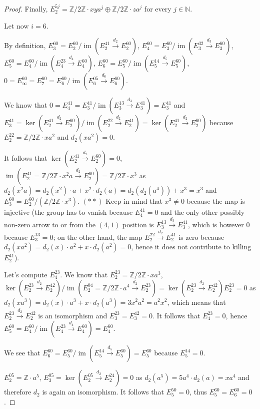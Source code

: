 \documentclass{article}
\newcommand{\numberset}{\mathbb}
\newcommand{\N}{\numberset{N}}
\newcommand{\Z}{\numberset{Z}}
\DeclareMathOperator{\im}{im}
\begin{document}
\begin{proof}
    Finally, $E^{5j}_2=\Z/2\Z\cdot xya^j\oplus\Z/2\Z\cdot za^j$ for every
    $j\in\N$.

    Let now $i=6$.

    By definition, $E^{60}_3=E^{60}_2/\im(E^{41}_2\xrightarrow{d_2}E^{60}_2)$,
    $E^{60}_4=E^{60}_3/\im(E^{32}_3\xrightarrow{d_3}E^{60}_3)$,
    $E^{60}_5=E^{60}_4/\im(E^{23}_4\xrightarrow{d_4}E^{60}_4)$,
    $E^{60}_6=E^{60}_5/\im(E^{14}_5\xrightarrow{d_5}E^{60}_5)$,
    $0=E^{60}_\infty=E^{60}_7=E^{60}_6/\im(E^{05}_6\xrightarrow{d_6}E^{60}_6)$.

    We know that
    $0=E^{41}_4=E^{41}_3/\im(E^{13}_3\xrightarrow{d_3}E^{41}_3)=E^{41}_3$ and
    $E^{41}_3=\ker(E^{41}_2\xrightarrow{d_2}E^{60}_2)/
    \im(E^{22}_2\xrightarrow{d_2}E^{41}_2)=\ker(E^{41}_2\xrightarrow{d_2}E^{60}_2)$
    because $E^{22}_2=\Z/2\Z\cdot xa^2$ and $d_2(xa^2)=0$.

    It follows that $\ker(E^{41}_2\xrightarrow{d_2}E^{60}_2)=0$,
    $\im(E^{41}_2=\Z/2\Z\cdot x^2a\xrightarrow{d_2}E^{60}_2)=\Z/2\Z\cdot x^3$ as
    $d_2(x^2a)=d_2(x^2)\cdot a+x^2\cdot d_2(a)=d_2(d_2(a^4))+x^3=x^3$ and
    $E^{60}_3=E^{60}_2/(\Z/2\Z\cdot x^3)$. $(**)$ Keep in mind that $x^3\neq 0$
    because the map is injective (the group has to vanish because $E^{41}_4=0$
    and the only other possibly non-zero arrow to
    or from the $(4,1)$ position is $E^{13}_3\xrightarrow{d_3}E^{41}_3$, which
    is however 0 because $E^{13}_3=0$; on the other hand, the map $E^{22}_2
    \xrightarrow{d_2}E^{41}_2$ is zero because $d_2(xa^2)=d_2(x)\cdot a^2+x\cdot
    d_2(a^2)=0$, hence it does not contribute to killing $E^{41}_2$).

    Let's compute $E^{23}_4$. We know that $E^{23}_2=\Z/2\Z\cdot xa^3$,
    $\ker(E^{23}_2\xrightarrow{d_2}E^{42}_2)/\im(E^{04}_2=\Z/2\Z\cdot a^4
    \xrightarrow{d_2}E^{23}_2)=\ker(E^{23}_2\xrightarrow{d_2}E^{42}_2)
    E^{23}_2=0$ as $d_2(xa^3)=d_2(x)\cdot a^3+x\cdot d_2(a^3)=3x^2a^2=a^2x^2$,
    which means that $E^{23}_2\xrightarrow{d_2}E^{42}_2$ is
    an isomorphism and $E^{23}_3=E^{42}_3=0$. It follows that $E^{23}_4=0$,
    hence $E^{60}_5=E^{60}_4/\im(E^{23}_4\xrightarrow{d_4}E^{60}_4)=E^{60}_4$.

    We see that
    $E^{60}_6=E^{60}_5/\im(E^{14}_5\xrightarrow{d_5}E^{60}_5)=E^{60}_5$ because
    $E^{14}_5=0$.

    $E^{05}_2=\Z\cdot a^5$,
    $E^{05}_3=\ker(E^{05}_2\xrightarrow{d_2}E^{24}_2)=0$ as
    $d_2(a^5)=5a^4\cdot d_2(a)=xa^4$ and therefore $d_2$ is again an
    isomorphism. It follows that $E^{50}_5=0$, thus $E^{60}_5=E^{60}_6=0$.


\end{proof}
\end{document}
